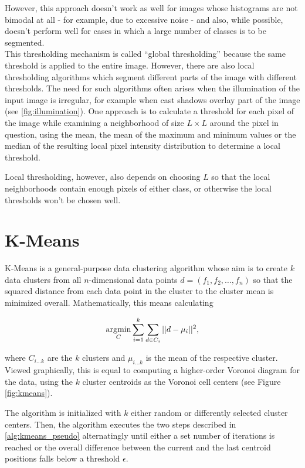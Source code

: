However, this approach doesn't work as well for images whose histograms are not bimodal at all - for example, due to excessive noise - and also, while possible, doesn't perform well for cases in which a large number of classes is to be segmented.\\

\noindent This thresholding mechanism is called ``global thresholding'' because the same threshold is applied to the entire image. However, there are also local thresholding algorithms which segment different parts of the image with different thresholds. The need for such algorithms often arises when the illumination of the input image is irregular, for example when cast shadows overlay part of the image (see \ref{fig:illumination}). One approach is to calculate a threshold for each pixel of the image while examining a neighborhood of size $L \times L$ around the pixel in question, using the mean, the mean of the maximum and minimum values or the median of the resulting local pixel intensity distribution to determine a local threshold.

Local thresholding, however, also depends on choosing $L$ so that the local neighborhoods contain enough pixels of either class, or otherwise the local thresholds won't be chosen well\cite[pp.~84--93]{machine_vision}.


	\section{K-Means}
K-Means \cite{kmeans} is a general-purpose data clustering algorithm whose aim is to create $k$ data clusters from all $n$-dimensional data points $d = (f_1, f_2, \dots, f_n)$ so that the squared distance from each data point in the cluster to the cluster mean is minimized overall. Mathematically, this means calculating

\[ \operatorname*{\arg\!\min} \limits_{C} \sum \limits_{i=1}^{k} \sum \limits_{d \in C_i} || d - \mu_i||^2 ,\]

\noindent where $C_{i \dots k}$ are the $k$ clusters and $\mu_{i \dots k}$ is the mean of the respective cluster. Viewed graphically, this is equal to computing a higher-order Voronoi diagram for the data, using the $k$ cluster centroids as the Voronoi cell centers (see Figure \ref{fig:kmeans}).

The algorithm is initialized with $k$ either random or differently selected cluster centers. Then, the algorithm executes the two steps described in \ref{alg:kmeans_pseudo} alternatingly until either a set number of iterations is reached or the overall difference between the current and the last centroid positions falls below a threshold $\epsilon$.

